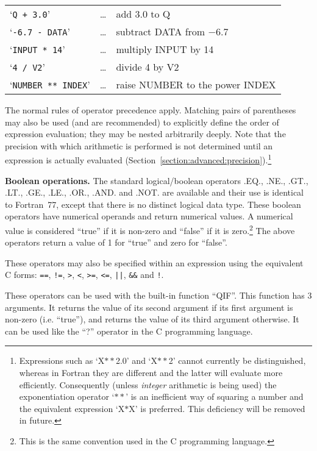 \documentclass[twoside,nolof,11pt]{starlink}
\providecommand{\name}[1]{\small{#1}}
\begin{document}
\begin{center}
\begin{tabular}{lcl}

`\texttt{Q + 3.0}' & \ldots & add 3.0 to Q\\
`\texttt{-6.7 - DATA}' & \dots & subtract \name{DATA} from $-$6.7\\
`\texttt{INPUT * 14}' & \ldots & multiply \name{INPUT} by 14 \\
`\texttt{4 / V2}' & \ldots & divide 4 by \name{V2}\\
`\texttt{NUMBER ** INDEX}' & \ldots & raise \name{NUMBER} to the power
\name{INDEX}

\end{tabular}
\end{center}


The normal rules of operator precedence apply.
Matching pairs of parentheses may also be used (and are recommended) to
explicitly define the order of expression evaluation; they may be nested
arbitrarily deeply.
Note that the precision with which arithmetic is performed is not determined
until an expression is actually evaluated
(Section~\ref{section:advanced:precision}).\footnote{
Expressions such as `X$**$2.0' and `X$**$2' cannot currently be
distinguished, whereas in Fortran they are different and the latter will
evaluate more efficiently.
Consequently (unless \emph{integer} arithmetic is being used) the
exponentiation operator `$**$' is an inefficient way of squaring a
number and the equivalent expression `X$*$X' is preferred.
This deficiency will be removed in future.}


\textbf{Boolean operations.}
The standard logical/boolean operators .EQ., .NE., .GT., .LT.,
.GE., .LE., .OR., .AND. and .NOT. are available and their use
is identical to Fortran~77, except that there is no distinct logical data
type. These boolean operators have numerical operands and return numerical
values. A numerical value is considered ``true'' if it is non-zero and
``false'' if it is zero.\footnote{This is the same convention used in
the C programming language.} The above operators return a value of 1 for
``true'' and zero for ``false''.

These operators may also be specified within an expression using the
equivalent C forms:
\verb#==#,
\verb#!=#,
\verb#>#,
\verb#<#,
\verb#>=#,
\verb#<=#,
\verb#||#,
\verb#&&# and
\verb#!#.

These operators can be used with the built-in function ``QIF''. This
function has 3 arguments. It returns the value of its second argument if its
first argument is non-zero (i.e. ``true''), and returns the value of its
third argument otherwise. It can be used like the ``?'' operator in the C
programming language.
\end{document}
